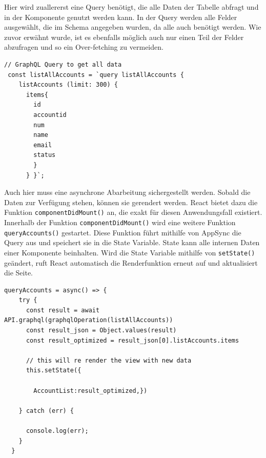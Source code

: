 Hier wird zuallererst eine Query benötigt, die alle Daten der Tabelle abfragt und in der Komponente genutzt werden kann.
In der Query werden alle Felder ausgewählt, die im Schema angegeben wurden, da alle auch benötigt werden.
Wie zuvor erwähnt wurde, ist es ebenfalls möglich auch nur einen Teil der Felder abzufragen und so ein Over-fetching zu vermeiden.

\begin{lstlisting}[basicstyle=\ttfamily\small, breaklines=true , frame = single, backgroundcolor=\color{flashwhite},caption={Query zum Accountaufruf (Datei: \textit{\nameref{lst:React AccountList}} )} ]
// GraphQL Query to get all data
 const listAllAccounts = `query listAllAccounts {
    listAccounts (limit: 300) {
      items{
        id
        accountid
        num
        name
        email
        status
        }
      } }`;
    \end{lstlisting}



Auch hier muss eine asynchrone Abarbeitung sichergestellt werden.
Sobald die Daten zur Verfügung stehen, können sie gerendert werden.
React bietet dazu die Funktion \verb+componentDidMount()+ an, die exakt für diesen Anwendungsfall existiert. \cite{ReactComp}
Innerhalb der Funktion \verb+componentDidMount()+ wird eine weitere Funktion \verb+queryAccounts()+ gestartet.
Diese Funktion führt mithilfe von AppSync die Query aus und speichert sie in die State Variable.\cite{AmplifyAPI}
State kann alle internen Daten einer Komponente beinhalten.
Wird die State Variable mithilfe von \verb+setState()+ geändert, ruft React automatisch die Renderfunktion erneut auf und aktualisiert die Seite.

\begin{lstlisting}[basicstyle=\ttfamily\small, breaklines=true , frame = single, backgroundcolor=\color{flashwhite},caption={Abruf der Daten und Speicherung in State Variable (Datei: \textit{\nameref{lst:React AccountList}} )} ]
queryAccounts = async() => {
    try {
      const result = await API.graphql(graphqlOperation(listAllAccounts))
      const result_json = Object.values(result)
      const result_optimized = result_json[0].listAccounts.items

      // this will re render the view with new data
      this.setState({

        AccountList:result_optimized,})

    } catch (err) {

      console.log(err);
    }
  }
\end{lstlisting}

